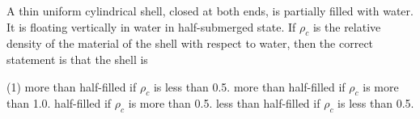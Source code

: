 
\item A thin uniform cylindrical shell, closed at both ends, is partially filled with water. It is floating vertically in water in half-submerged state. If \(\rho_c\) is the relative density of the material of the shell with respect to water, then the correct statement is that the shell is
    \begin{tasks}(1)
        \task more than half-filled if \(\rho_c\) is less than 0.5.
        \task more than half-filled if \(\rho_c\) is more than 1.0.
        \task half-filled if \(\rho_c\) is more than 0.5.
        \task less than half-filled if \(\rho_c\) is less than 0.5.
    \end{tasks}
